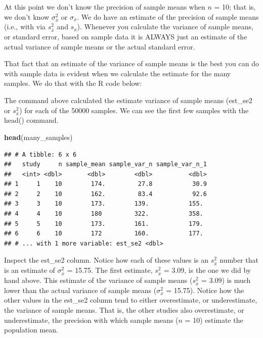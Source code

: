 \documentclass[
]{krantz}
\makeatletter
\newenvironment{Shaded}{\begin{snugshade}}{\end{snugshade}}
\newcommand{\DataTypeTok}[1]{\textcolor[rgb]{0.27,0.27,0.27}{#1}}
\newcommand{\DecValTok}[1]{\textcolor[rgb]{0.06,0.06,0.06}{#1}}
\newcommand{\KeywordTok}[1]{\textcolor[rgb]{0.27,0.27,0.27}{\textbf{#1}}}
\newcommand{\NormalTok}[1]{#1}
\newcommand{\OperatorTok}[1]{\textcolor[rgb]{0.43,0.43,0.43}{\textbf{#1}}}
\newcommand{\StringTok}[1]{\textcolor[rgb]{0.5,0.5,0.5}{#1}}
\newenvironment{kframe}{%
\medskip{}
\setlength{\fboxsep}{.8em}
 \def\at@end@of@kframe{}%
 \ifinner\ifhmode%
  \def\at@end@of@kframe{\end{minipage}}%
  \begin{minipage}{\columnwidth}%
 \fi\fi%
 \def\FrameCommand##1{\hskip\@totalleftmargin \hskip-\fboxsep
 \colorbox{shadecolor}{##1}\hskip-\fboxsep
     \hskip-\linewidth \hskip-\@totalleftmargin \hskip\columnwidth}%
 \MakeFramed {\advance\hsize-\width
   \@totalleftmargin\z@ \linewidth\hsize
   \@setminipage}}%
 {\par\unskip\endMakeFramed%
 \at@end@of@kframe}
\renewenvironment{Shaded}{\begin{kframe}}{\end{kframe}}
\makeatother
\begin{document}
At this point we don't know the precision of sample means when \(n\) = 10; that is, we don't know \(\sigma_{\bar{x}}^2\) or \(\sigma_{\bar{x}}\). We do have an estimate of the precision of sample means (i.e., with via \(s_{\bar{x}}^2\) and \(s_{\bar{x}}\)). Whenever you calculate the variance of sample means, or standard error, based on sample data it is ALWAYS just an estimate of the actual variance of sample means or the actual standard error.

That fact that an estimate of the variance of sample means is the best you can do with sample data is evident when we calculate the estimate for the many samples. We do that with the R code below:

\begin{Shaded}
\end{Shaded}

The command above calculated the estimate variance of sample means (est\_se2 or \(s_{\bar{x}}^2\)) for each of the 50000 samples. We can see the first few samples with the head() command.

\begin{Shaded}
\begin{Highlighting}[]
\KeywordTok{head}\NormalTok{(many_samples)}
\end{Highlighting}
\end{Shaded}

\begin{verbatim}
## # A tibble: 6 x 6
##   study     n sample_mean sample_var_n sample_var_n_1
##   <int> <dbl>       <dbl>        <dbl>          <dbl>
## 1     1    10        174.         27.8           30.9
## 2     2    10        162.         83.4           92.6
## 3     3    10        173.        139.           155. 
## 4     4    10        180         322.           358. 
## 5     5    10        173.        161.           179. 
## 6     6    10        172         160.           177. 
## # ... with 1 more variable: est_se2 <dbl>
\end{verbatim}

Inspect the est\_se2 column. Notice how each of these values is an \(s_{\bar{x}}^2\) number that is an estimate of \(\sigma_{\bar{x}}^2\) = 15.75. The first estimate, \(s_{\bar{x}}^2\) = 3.09, is the one we did by hand above. This estimate of the variance of sample means (\(s_{\bar{x}}^2\) = 3.09) is much lower than the actual variance of sample means (\(\sigma_{\bar{x}}^2\) = 15.75). Notice how the other values in the est\_se2 column tend to either overestimate, or underestimate, the variance of sample means. That is, the other studies also overestimate, or underestimate, the precision with which sample means (\(n\) = 10) estimate the population mean.
\end{document}
